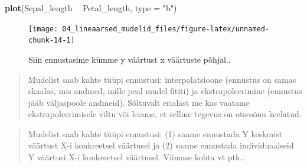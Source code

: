 \documentclass[]{book}
\newenvironment{Shaded}{\begin{snugshade}}{\end{snugshade}}
\newcommand{\CommentTok}[1]{\textcolor[rgb]{0.56,0.35,0.01}{\textit{#1}}}
\newcommand{\DataTypeTok}[1]{\textcolor[rgb]{0.13,0.29,0.53}{#1}}
\newcommand{\DecValTok}[1]{\textcolor[rgb]{0.00,0.00,0.81}{#1}}
\newcommand{\KeywordTok}[1]{\textcolor[rgb]{0.13,0.29,0.53}{\textbf{#1}}}
\newcommand{\NormalTok}[1]{#1}
\newcommand{\OperatorTok}[1]{\textcolor[rgb]{0.81,0.36,0.00}{\textbf{#1}}}
\newcommand{\StringTok}[1]{\textcolor[rgb]{0.31,0.60,0.02}{#1}}
\begin{document}
\begin{Shaded}
\end{Shaded}

\begin{Shaded}
\begin{Highlighting}[]
\KeywordTok{plot}\NormalTok{(Sepal_length }\OperatorTok{~}\StringTok{ }\NormalTok{Petal_length, }\DataTypeTok{type =} \StringTok{"b"}\NormalTok{)}
\end{Highlighting}
\end{Shaded}

\begin{figure}

{\centering \texttt{[image: 04\_lineaarsed\_mudelid\_files/figure-latex/unnamed-chunk-14-1]} 

}

\caption{Siin ennustasime kümme y väärtust x väärtuste põhjal..}\label{fig:unnamed-chunk-14}
\end{figure}

\begin{quote}
Mudelist saab kahte tüüpi ennustusi: interpolatsioone (ennustus on samas skaalas, mis andmed, mille peal mudel fititi) ja ekstrapoleerimine (ennustus jääb väljaspoole andmeid). Sõltuvalt erialast me kas vaatame ekstrapoleerimisele viltu või leiame, et selline tegevus on otsesõnu keelatud.
\end{quote}

\begin{quote}
Mudelist saab kahte tüüpi ennustusi: (1) saame ennustada Y keskmist väärtust X-i konkreetsel väärtusel ja (2) saame ennustada individuaalseid Y väärtusi X-i konkreetsel väärtusel. Viimase kohta vt ptk\ldots{}
\end{quote}
\end{document}
